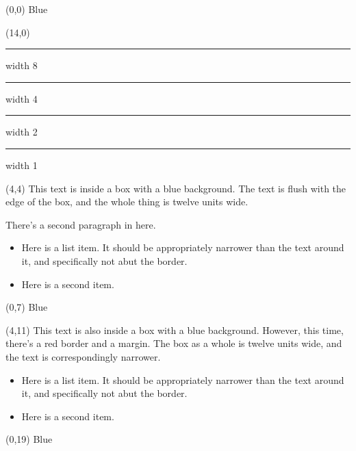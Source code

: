 \documentclass{article}
\begin{document}

\begin{textblock}{4}(0,0)
  Blue
\end{textblock}

\begin{textblock}{8}(14,0)
  \hrule width 8\TPHorizModule
  \TPVertModule
  \hrule width 4\TPHorizModule
  \TPVertModule
  \hrule width 2\TPHorizModule
  \TPVertModule
  \hrule width 1\TPHorizModule
\end{textblock}  

\begin{textblock}{12}(4,4)
  This text is inside a box with a blue background.  The text is flush
  with the edge of the box, and the whole thing is twelve units wide.

  There's a second paragraph in here.
  \begin{itemize}
  \item Here is a list item.  It should be appropriately narrower than
  the text around it, and specifically not abut the border.
  \item Here is a second item.
  \end{itemize}
\end{textblock}

\TPshowboxestrue
{}
\setlength\TPboxrulesize{0.25\TPHorizModule}

\TPMargin{1\TPHorizModule}

\begin{textblock}{4}(0,7)
  Blue
\end{textblock}

\begin{textblock}{12}(4,11)
  This text is also inside a box with a blue background.  However,
  this time, there's a red border and a margin.  The box as a whole is
  twelve units wide, and the text is correspondingly narrower.
  \begin{itemize}
  \item Here is a list item.  It should be appropriately narrower than
  the text around it, and specifically not abut the border.
  \item Here is a second item.
  \end{itemize}
\end{textblock}

\TPMargin*{1\TPHorizModule}

\begin{textblock}{4}(0,19)
  Blue
\end{textblock}
\end{document}
